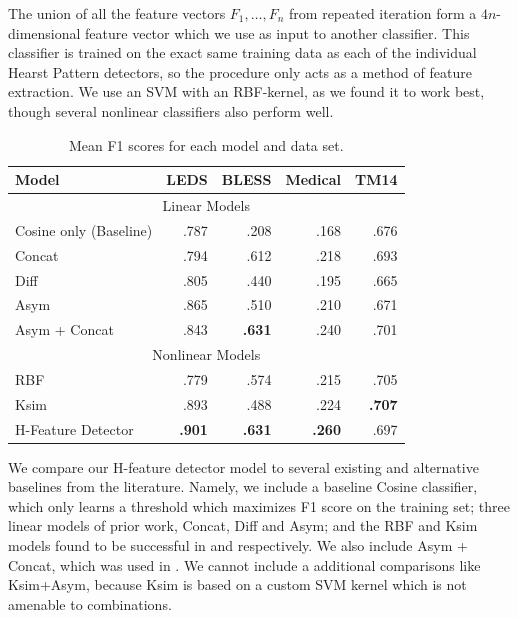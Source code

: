 \documentclass[12pt]{article}
\begin{document}
The union of all the feature vectors $F_1, \ldots, F_n$ from repeated iteration form a
$4n$-dimensional feature vector which we use as input to another classifier.
This classifier is trained on the exact same training data as each of the
individual Hearst Pattern detectors, so the procedure only acts as a method of
feature extraction. We use an SVM with an RBF-kernel, as we found it to work
best, though several nonlinear classifiers also perform well.

\begin{table}
\centering
\begin{small}
\begin{tabular}{|l|rrrr|}
  \hline
  Model            &      LEDS   &      BLESS  &      Medical  &      TM14   \\
  \hline
  \hline
  \multicolumn{5}{|c|}{Linear Models}\\
  \hline
  Cosine only (Baseline)              &      .787   &      .208   &      .168     &      .676   \\
  Concat                              &      .794   &      .612   &      .218     &      .693   \\
  Diff \cite{weeds:2014:coling}       &      .805   &      .440   &      .195     &      .665   \\
  Asym \cite{roller:2014:coling}      &      .865   &      .510   &      .210     &      .671   \\
  Asym + Concat \cite{beltagy:2016:cl}&      .843   &  {\bf.631}  &      .240     &      .701   \\
  \hline
  \multicolumn{5}{|c|}{Nonlinear Models}\\
  \hline
  RBF                                         &      .779   &      .574   &      .215     &      .705   \\
  Ksim \cite{levy:2014:conll}                 &      .893   &      .488   &      .224     &  {\bf.707}  \\
  H-Feature Detector \cite{roller:2016:emnlp} &  {\bf.901}  &  {\bf.631}  &  {\bf.260}    &      .697   \\
  \hline
\end{tabular}
\end{small}
\caption{Mean F1 scores for each model and data set.}
\label{tab:hfeatureresults}
\end{table}

We compare our H-feature detector model to several existing and alternative
baselines from the literature. Namely, we include a baseline Cosine classifier,
which only learns a threshold which maximizes F1 score on the training set;
three linear models of prior work, Concat, Diff and Asym; and the RBF and Ksim
models found to be successful in  and
 respectively. We also include
Asym + Concat, which was used in . We cannot include a
additional comparisons like Ksim+Asym, because Ksim is based on a custom SVM
kernel which is not amenable to combinations.
\end{document}

